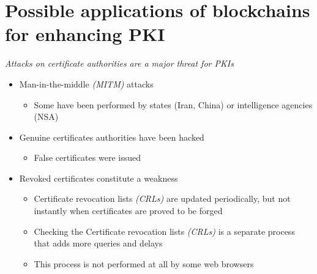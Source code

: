 \section[Blockchains for PKI]{Possible applications of blockchains for enhancing PKI}




\begin{frame}
\emph{Attacks on certificate authorities are a major threat for PKIs}

\begin{itemize}
\item Man-in-the-middle \emph{(MITM)} attacks
\begin{itemize}
\item Some have been performed by states (Iran, China) or intelligence agencies (NSA)
\end{itemize}
\item Genuine certificates authorities have been hacked
\begin{itemize}
\item False certificates were issued
\end{itemize}
\item Revoked certificates constitute a weakness
\begin{itemize}
\item Certificate revocation lists \emph{(CRLs)} are updated periodically, but not instantly when certificates are proved to be forged
\item Checking the Certificate revocation lists \emph{(CRLs)} is a separate process that adds more queries and delays
\item This process is not performed at all by some web browsers
\end{itemize}
\end{itemize}


\end{frame}

